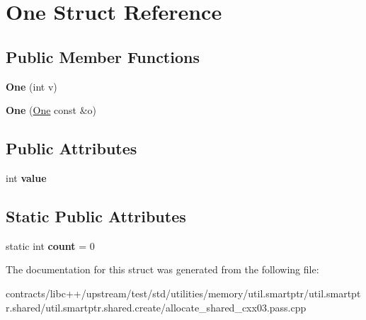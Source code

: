 \hypertarget{struct_one}{}\section{One Struct Reference}
\label{struct_one}
\subsection*{Public Member Functions}
\begin{DoxyCompactItemize}
\item 
\mbox{\label{struct_one_ac84a453ff705e4e5cfd39c870cd02c35}} 
{\bfseries One} (int v)
\item 
\mbox{\label{struct_one_ab2398e86e78057b396e6fd27e8c4fc97}} 
{\bfseries One} (\mbox{\hyperlink{struct_one}{One}} const \&o)
\end{DoxyCompactItemize}
\subsection*{Public Attributes}
\begin{DoxyCompactItemize}
\item 
\mbox{\label{struct_one_a6664cb3b47c7df1bbdbc2a76e4a53f9e}} 
int {\bfseries value}
\end{DoxyCompactItemize}
\subsection*{Static Public Attributes}
\begin{DoxyCompactItemize}
\item 
\mbox{\label{struct_one_a09442603012b3eefbbb4f8c8c83affff}} 
static int {\bfseries count} = 0
\end{DoxyCompactItemize}


The documentation for this struct was generated from the following file\+:\begin{DoxyCompactItemize}
\item 
contracts/libc++/upstream/test/std/utilities/memory/util.\+smartptr/util.\+smartptr.\+shared/util.\+smartptr.\+shared.\+create/allocate\+\_\+shared\+\_\+cxx03.\+pass.\+cpp\end{DoxyCompactItemize}

